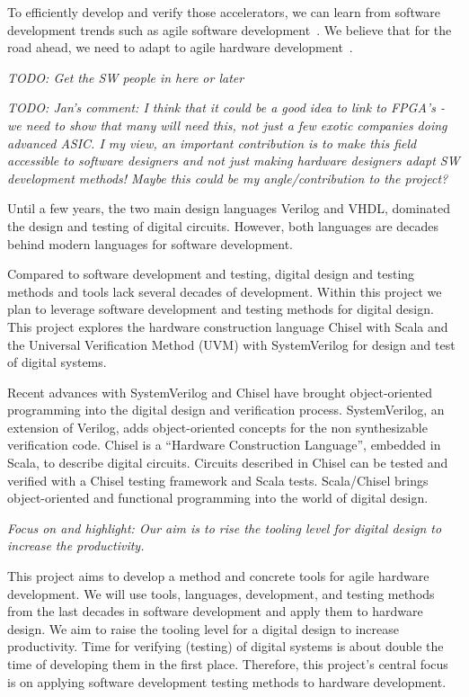 \documentclass[fleqn,12pt]{article}
\newcommand{\todo}[1]{{\it TODO: #1}}
\begin{document}
To efficiently develop and verify those accelerators, we can learn from software development trends such as agile software development~\cite{agile:manifesto}.
We believe that for the road ahead, we need to adapt to agile hardware development~\cite{henn-patt:turing:2019}.

\todo{Get the SW people in here or later}

\todo{Jan's comment: I think that it could be a good idea to link to FPGA's - we need to show that many will need this, not just a few exotic companies doing advanced ASIC. 
I my view, an important contribution is to make this field accessible to software designers and not just making hardware designers adapt SW development methods! Maybe this could be my angle/contribution to the project?}

Until a few years, the two main design languages Verilog and VHDL, dominated the
design and testing of digital circuits. However, both languages are decades behind
modern languages for software development.

Compared to software development and testing, digital design and testing methods
and tools lack several decades of development. Within this project we plan to
leverage software development and testing methods for digital design.
This project explores the hardware construction language Chisel with Scala
and the Universal Verification Method (UVM) with SystemVerilog for
design and test of digital systems.

Recent advances with SystemVerilog and Chisel \cite{chisel:dac2012, chisel:book} have brought object-oriented programming
into the digital design and verification process. SystemVerilog, an extension of Verilog, adds object-oriented concepts for the non synthesizable verification code.
Chisel is a ``Hardware Construction Language'', embedded in Scala, to describe digital circuits.
Circuits described in Chisel can be tested and verified with a Chisel testing framework and Scala tests.
Scala/Chisel brings object-oriented and functional programming into the world of
digital design.


\emph{Focus on and highlight: Our aim is to rise the tooling level for digital design to increase
the productivity.}

This project aims to develop a method and concrete tools for agile hardware development.
We will use tools, languages, development, and testing methods from the last decades in
software development and apply them to hardware design.
We aim to raise the tooling level for a digital design to increase productivity.
Time for verifying (testing) of digital systems is about double the time of developing
them in the first place.
Therefore, this project's central focus is on applying software development
testing methods to hardware development.
\end{document}
